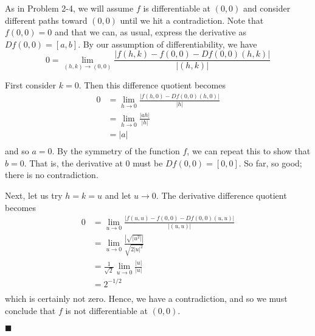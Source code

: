 \documentclass[12pt]{article}
\renewcommand{\qed}{\hfill$\blacksquare$}
\renewenvironment{proof}{\begin{addmargin}[1em]{0em}\begin{newproof}}{\end{newproof}\end{addmargin}\qed}
\begin{document}
\begin{proof}
As in Problem 2-4, we will assume $f$ is differentiable at $\left(0,0\right)$ and consider different paths toward $\left(0,0\right)$ until we hit a contradiction. Note that $f\left(0,0\right)=0$ and that we can, as usual, express the derivative as $Df\left(0,0\right) = \left[a,b\right]$. By our assumption of differentiability, we have
$$ 0 = \lim_{\left(h,k\right)\rightarrow \left(0,0\right)} \frac{\left|f\left(h,k\right) - f\left(0,0\right) - Df\left(0,0\right) \left(h,k\right)\right|}{\left|\left(h,k\right)\right|} $$ 

First consider $k=0$. Then this difference quotient becomes
\begin{equation*}\begin{split} 
0 & = \lim_{h\rightarrow 0} \frac{\left| f\left(h,0\right) - Df\left(0,0\right)\left(h,0\right)\right|}{\left|h\right|} \\
& = \lim_{h\rightarrow 0} \frac{\left|a h\right|}{\left|h\right|} \\
& = \left|a\right| \\
\end{split}\end{equation*}
and so $a= 0$. By the symmetry of the function $f$, we can repeat this to show that $b=0$. That is, the derivative at $0$ must be $Df\left(0,0\right) = \left[0,0\right]$. So far, so good; there is no contradiction.

Next, let us try $h=k=u$ and let $u\rightarrow 0$. The derivative difference quotient becomes
\begin{equation*}\begin{split}
0 & = \lim_{u\rightarrow 0} \frac{\left| f\left(u,u\right) - f\left(0,0\right) - Df\left(0,0\right) \left(u,u\right)\right|}{\left|\left(u,u\right)\right|} \\
& = \lim_{u\rightarrow 0} \frac{\left| \sqrt{\left|u^2\right|} \right|}{\sqrt{2 \left|u\right|^2}} \\
& = \frac{1}{\sqrt{2}} \lim_{u\rightarrow 0} \frac{\left| u\right|}{\left| u\right|} \\
& = 2^{-1/2} \\
\end{split}\end{equation*}
which is certainly not zero. Hence, we have a contradiction, and so we must conclude that $f$ is not differentiable at $\left(0,0\right)$.
\end{proof}
\end{document}
